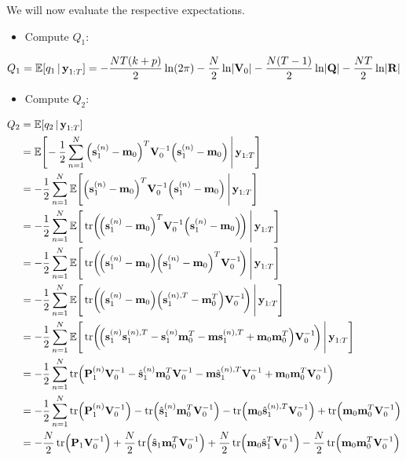 		We will now evaluate the respective expectations.
		\begin{itemize}
			\item Compute \(Q_1\):
		\end{itemize}
		\begin{equation*}
			Q_1 = \mathbb{E}[q_1 \,\vert\, \boldsymbol{\mathrm{y}}_{1:T}] = -\frac{NT(k + p)}{2} \ln(2\pi) - \frac{N}{2} \ln \lvert \boldsymbol{\mathrm{V}}_0 \rvert - \frac{N(T - 1)}{2} \ln \lvert \boldsymbol{\mathrm{Q}} \rvert - \frac{NT}{2} \ln \lvert \boldsymbol{\mathrm{R}} \rvert
		\end{equation*}
		\pagebreak

		\begin{itemize}
			\item Compute \(Q_2\):
		\end{itemize}
		\begin{align*}
			Q_2
				&= \E[q_2 \given \vec{y}_{1:T}] \\
				&= \E\Bigg[\! -\frac{1}{2} \sum_{n = 1}^{N} \Big( \vec{s}_1^{(n)} - \vec{m}_0 \Big)^T \mat{V}_0^{-1} \Big( \vec{s}_1^{(n)} - \vec{m}_0 \Big) \Bigggiven \vec{y}_{1:T} \Bigg] \\
				&= -\frac{1}{2} \sum_{n = 1}^{N} \E\Bigg[ \Big( \vec{s}_1^{(n)} - \vec{m}_0 \Big)^T \mat{V}_0^{-1} \Big( \vec{s}_1^{(n)} - \vec{m}_0 \Big) \Bigggiven \vec{y}_{1:T} \Bigg] \\
				&= -\frac{1}{2} \sum_{n = 1}^{N} \E\Bigg[ \tr\!\bigg(\!\Big( \vec{s}_1^{(n)} - \vec{m}_0 \Big)^T \mat{V}_0^{-1} \Big( \vec{s}_1^{(n)} - \vec{m}_0 \Big)\!\bigg) \Bigggiven \vec{y}_{1:T} \Bigg] \\
				&= -\frac{1}{2} \sum_{n = 1}^{N} \E\Bigg[ \tr\!\bigg(\!\Big( \vec{s}_1^{(n)} - \vec{m}_0 \Big) \Big( \vec{s}_1^{(n)} - \vec{m}_0 \Big)^T \mat{V}_0^{-1} \!\bigg) \Bigggiven \vec{y}_{1:T} \Bigg] \\
				&= -\frac{1}{2} \sum_{n = 1}^{N} \E\Bigg[ \tr\!\bigg(\!\Big( \vec{s}_1^{(n)} - \vec{m}_0 \Big) \Big( \vec{s}_1^{(n), T} - \vec{m}_0^T \Big) \mat{V}_0^{-1} \!\bigg) \Bigggiven \vec{y}_{1:T} \Bigg] \\
				&= -\frac{1}{2} \sum_{n = 1}^{N} \E\Bigg[ \tr\!\bigg(\! \Big( \vec{s}_1^{(n)} \vec{s}_1^{(n), T} - \vec{s}_1^{(n)} \vec{m}_0^T - \vec{m} \vec{s}_1^{(n), T} + \vec{m}_0 \vec{m}_0^T \Big) \mat{V}_0^{-1} \!\bigg) \Bigggiven \vec{y}_{1:T} \Bigg] \\
				&= -\frac{1}{2} \sum_{n = 1}^{N} \tr\!\Big( \mat{P}_1^{(n)} \mat{V}_0^{-1} - \hat{\vec{s}}_1^{(n)} \vec{m}_0^T \mat{V}_0^{-1} - \vec{m} \hat{\vec{s}}_1^{(n), T} \mat{V}_0^{-1} + \vec{m}_0 \vec{m}_0^T \mat{V}_0^{-1} \Big) \\
				&= -\frac{1}{2} \sum_{n = 1}^{N} \tr\!\Big( \mat{P}_1^{(n)} \mat{V}_0^{-1} \Big) - \tr\!\Big( \hat{\vec{s}}_1^{(n)} \vec{m}_0^T \mat{V}_0^{-1} \Big) - \tr\!\Big( \vec{m}_0 \hat{\vec{s}}_1^{(n), T} \mat{V}_0^{-1} \Big) + \tr\!\Big(\vec{m}_0 \vec{m}_0^T \mat{V}_0^{-1} \Big) \\
				&=  -\frac{N}{2} \tr\!\Big( \mat{P}_1 \mat{V}_0^{-1} \Big) + \frac{N}{2} \tr\!\Big( \hat{\vec{s}}_1 \vec{m}_0^T \mat{V}_0^{-1} \Big) + \frac{N}{2} \tr\!\Big( \vec{m}_0 \hat{\vec{s}}_1^T \mat{V}_0^{-1} \Big) - \frac{N}{2} \tr\!\Big(\vec{m}_0 \vec{m}_0^T \mat{V}_0^{-1} \Big)
		\end{align*}
		\vfill
		\pagebreak


